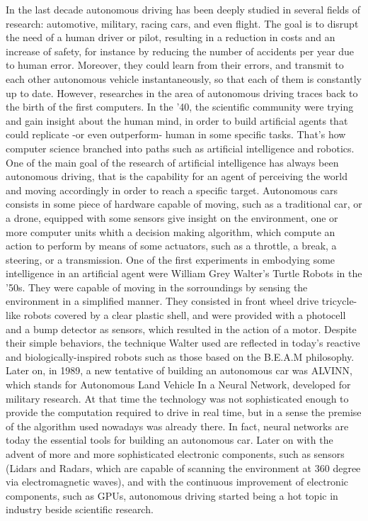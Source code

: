 In the last decade autonomous driving has been deeply studied in several fields of research: automotive, military, racing cars, and even flight. The goal is to disrupt the need of a human driver or pilot, resulting in a reduction in costs and an increase of safety, for instance by reducing the number of accidents per year due to human error. Moreover, they could learn from their errors, and transmit to each other autonomous vehicle instantaneously, so that each of them is constantly up to date.
However, researches in the area of autonomous driving traces back to the birth of the first computers. In the '40, the scientific community were trying and gain insight about the human mind, in order to build artificial agents that could replicate -or even outperform- human in some specific tasks.
That's how computer science branched into paths such as artificial intelligence and robotics.
One of the main goal of the research of artificial intelligence has always been autonomous driving, that is the capability for an agent of perceiving the world and moving accordingly in order to reach a specific target.
Autonomous cars consists in some piece of hardware capable of moving, such as a traditional car, or a drone, equipped with some sensors give insight on the environment, one or more computer units whith a decision making algorithm, which compute an action to perform by means of some actuators, such as a throttle, a break, a steering, or a transmission.
One of the first experiments in embodying some intelligence in an artificial agent were William Grey Walter's Turtle Robots in the '50s. They were capable of moving in the sorroundings by sensing the environment in a simplified manner. They consisted in front wheel drive tricycle-like robots covered by a clear plastic shell, and were provided with a photocell and a bump detector as sensors, which resulted in the action of a motor. Despite their simple behaviors, the technique Walter used are reflected in today's reactive and biologically-inspired robots such as those based on the B.E.A.M philosophy.
Later on, in 1989, a new tentative of building an autonomous car was ALVINN, which stands for Autonomous Land Vehicle In a Neural Network, developed for military research.
At that time the technology was not sophisticated enough to provide the computation required to drive in real time, but in a sense the premise of the algorithm used nowadays was already there. In fact, neural networks are today the essential tools for building an autonomous car.
Later on with the advent of more and more sophisticated electronic components, such as sensors (Lidars and Radars, which are capable of scanning the environment at 360 degree via electromagnetic waves), and with the continuous improvement of electronic components, such as GPUs, autonomous driving started being a hot topic in industry beside scientific research.
